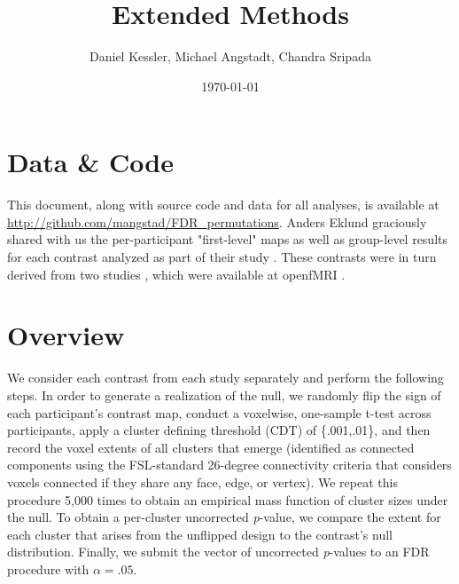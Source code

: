 \documentclass{article}
\author{Daniel Kessler, Michael Angstadt, Chandra Sripada}
\date{\today}
\title{Extended Methods}
\begin{document}
\maketitle

\section{Data \& Code}
This document, along with source code and data for all analyses, is available at \url{http://github.com/mangstad/FDR_permutations}. 
Anders Eklund graciously shared with us the per-participant "first-level" maps as well as group-level results for each contrast analyzed as part of their study  \cite{eklund_cluster_2016}. These contrasts were in turn derived from two studies \cite{duncan_consistency_2009,tom_neural_2007}, which were available at openfMRI \cite{poldrack_toward_2013}. 


\section{Overview}
We consider each contrast from each study separately and perform the following steps. 
In order to generate a realization of the null, we randomly flip the sign of each participant's contrast map, conduct a voxelwise, one-sample t-test across participants, apply a cluster defining threshold (CDT) of \{.001,.01\}, and then record the voxel extents of all clusters that emerge (identified as connected components using the FSL-standard 26-degree connectivity criteria that considers voxels connected if they share any face, edge, or vertex). 
We repeat this procedure 5,000 times to obtain an empirical mass function of cluster sizes under the null. 
To obtain a per-cluster uncorrected \textit{p}-value, we compare the extent for each cluster that arises from the unflipped design to the contrast's null distribution. 
Finally, we submit the vector of uncorrected \textit{p}-values to an FDR procedure \cite{benjamini_controlling_1995} with $\alpha = .05$.
\end{document}
